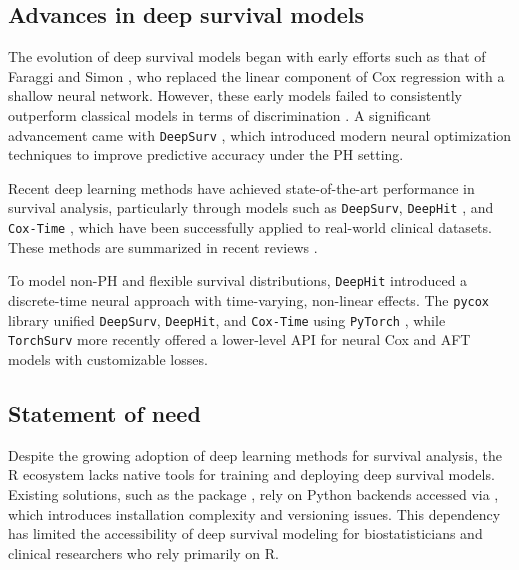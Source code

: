 \subsection{Advances in deep survival models}\label{advances-in-deep-survival-models}

The evolution of deep survival models began with early efforts such as that of Faraggi and Simon \citep{faraggi1995neural}, who replaced the linear component of Cox regression with a shallow neural network. However, these early models failed to consistently outperform classical models in terms of discrimination \citep{xiang2000comparison, sargent2001comparison}. A significant advancement came with \texttt{DeepSurv} \citep{katzman2018deepsurv}, which introduced modern neural optimization techniques to improve predictive accuracy under the PH setting.

Recent deep learning methods have achieved state-of-the-art performance in survival analysis, particularly through models such as \texttt{DeepSurv}, \texttt{DeepHit} \citep{lee2018deephit}, and \texttt{Cox-Time} \citep{kvamme2019time}, which have been successfully applied to real-world clinical datasets. These methods are summarized in recent reviews \citep{wiegrebe2024deep}.

To model non-PH and flexible survival distributions, \texttt{DeepHit} \citep{lee2018deephit} introduced a discrete-time neural approach with time-varying, non-linear effects. The \texttt{pycox} library unified \texttt{DeepSurv}, \texttt{DeepHit}, and \texttt{Cox-Time} using \texttt{PyTorch} \citep{paszke2019pytorch}, while \texttt{TorchSurv} \citep{monod2024torchsurv} more recently offered a lower-level API for neural Cox and AFT models with customizable losses.

\subsection{Statement of need}\label{statement-of-need}

Despite the growing adoption of deep learning methods for survival analysis, the R ecosystem lacks native tools for training and deploying deep survival models. Existing solutions, such as the  package \citep{survivalmodels2020}, rely on Python backends accessed via  \citep{reticulate2017}, which introduces installation complexity and versioning issues. This dependency has limited the accessibility of deep survival modeling for biostatisticians and clinical researchers who rely primarily on R.

